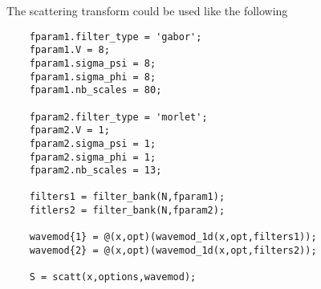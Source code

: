 \documentclass[twocolumn]{article}
\begin{document}
The scattering transform could be used like the following
\begin{lstlisting}
	fparam1.filter_type = 'gabor';
	fparam1.V = 8;
	fparam1.sigma_psi = 8;
	fparam1.sigma_phi = 8;
	fparam1.nb_scales = 80;
	
	fparam2.filter_type = 'morlet';
	fparam2.V = 1;
	fparam2.sigma_psi = 1;
	fparam2.sigma_phi = 1;
	fparam2.nb_scales = 13;
	
	filters1 = filter_bank(N,fparam1);
	fitlers2 = filter_bank(N,fparam2);
	
	wavemod{1} = @(x,opt)(wavemod_1d(x,opt,filters1));
	wavemod{2} = @(x,opt)(wavemod_1d(x,opt,filters2));
	
	S = scatt(x,options,wavemod);
\end{lstlisting}
\end{document}
